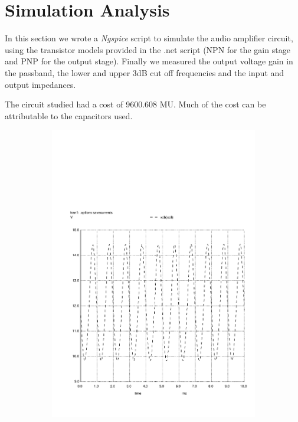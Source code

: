 \section{Simulation Analysis}
\label{sec:simulation}

In this section we wrote a \textit{Ngspice} script to simulate the audio
amplifier circuit, using the transistor models provided in the .net script
(NPN for the gain stage and PNP for the output stage).
Finally we measured the output voltage gain in the passband,
the lower and upper 3dB cut off frequencies and the input and output
impedances.


The circuit studied had a cost of 9600.608 MU. Much of the cost can be
attributable to the capacitors used.


\begin{figure}[h]
    \centering
    \begin{subfigure}{0.23\textwidth}
        \includegraphics[width=\linewidth, clip]{vo1.pdf}

\end{subfigure}
\end{figure}
